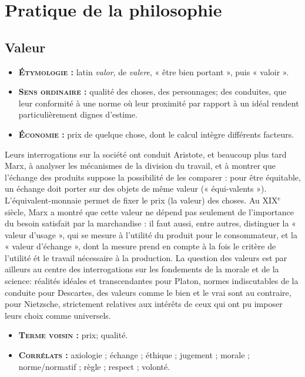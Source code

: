 
\section{Pratique de la philosophie}

\subsection{Valeur}


\begin{itemize}[leftmargin=1cm, label=, itemsep=1pt]
\item {\bf \textsc{Étymologie} :} latin {\it valor}, de {\it valere},
« être bien portant », puis « valoir ».
\item {\bf \textsc{Sens ordinaire} :} qualité
des choses, des personnages; des
conduites, que leur conformité à
une norme où leur proximité par
rapport à un idéal rendent
particulièrement dignes d'estime.
\item {\bf \textsc{Économie} :} prix de quelque chose, dont
le calcul intègre différents facteurs.
\end{itemize}
Leurs interrogations sur la société ont
conduit Aristote, et beaucoup plus tard
Marx, à analyser les mécanismes de la
division du travail, et à montrer que
l'échange des produits suppose la possibilité
de les comparer : pour être équitable,
un échange doit porter sur des
objets de même valeur (« équi-valents »).
L'équivalent-monnaie permet de fixer le
prix (la valeur) des choses. Au {\footnotesize XIX}$^\text{e}$
siècle, Marx a montré que cette valeur
ne dépend pas seulement de l'importance
du besoin satisfait par la marchandise :
il faut aussi, entre autres, distinguer
la « valeur d'usage », qui se
mesure à l'utilité du produit pour le
consommateur, et la « valeur d'échange »,
dont la mesure prend en compte à la
fois le critère de l'utilité ét le travail
nécessaire à la production. La question
des valeurs est par ailleurs au centre des
interrogations sur les fondements de la
morale et de la science: réalités
idéales et transcendantes pour Platon,
normes indiscutables de la conduite
pour Descartes, des valeurs comme le
bien et le vrai sont au contraire, pour
Nietzsche, strictement relatives aux
intérêts de ceux qui ont pu imposer
leurs choix comme universels.

\begin{itemize}[leftmargin=1cm, label=, itemsep=1pt]
\item {\bf \textsc{Terme voisin} :} prix; qualité.
\item {\bf \textsc{Corrélats} :} axiologie ; échange ;
éthique ; jugement ; morale ;
norme/normatif ; règle ; respect ;
volonté.
\end{itemize}

